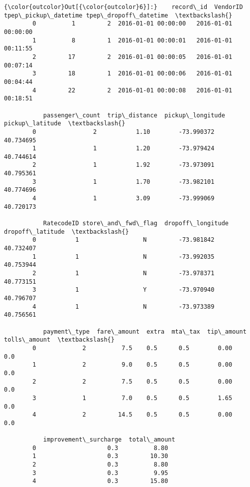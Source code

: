 \documentclass[11pt]{article}
\begin{document}
\begin{Verbatim}[commandchars=\\\{\}]
{\color{outcolor}Out[{\color{outcolor}6}]:}    record\_id  VendorID tpep\_pickup\_datetime tpep\_dropoff\_datetime  \textbackslash{}
        0          1         2  2016-01-01 00:00:00   2016-01-01 00:00:00   
        1          8         1  2016-01-01 00:00:01   2016-01-01 00:11:55   
        2         17         2  2016-01-01 00:00:05   2016-01-01 00:07:14   
        3         18         1  2016-01-01 00:00:06   2016-01-01 00:04:44   
        4         22         2  2016-01-01 00:00:08   2016-01-01 00:18:51   
        
           passenger\_count  trip\_distance  pickup\_longitude  pickup\_latitude  \textbackslash{}
        0                2           1.10        -73.990372        40.734695   
        1                1           1.20        -73.979424        40.744614   
        2                1           1.92        -73.973091        40.795361   
        3                1           1.70        -73.982101        40.774696   
        4                1           3.09        -73.999069        40.720173   
        
           RatecodeID store\_and\_fwd\_flag  dropoff\_longitude  dropoff\_latitude  \textbackslash{}
        0           1                  N         -73.981842         40.732407   
        1           1                  N         -73.992035         40.753944   
        2           1                  N         -73.978371         40.773151   
        3           1                  Y         -73.970940         40.796707   
        4           1                  N         -73.973389         40.756561   
        
           payment\_type  fare\_amount  extra  mta\_tax  tip\_amount  tolls\_amount  \textbackslash{}
        0             2          7.5    0.5      0.5        0.00           0.0   
        1             2          9.0    0.5      0.5        0.00           0.0   
        2             2          7.5    0.5      0.5        0.00           0.0   
        3             1          7.0    0.5      0.5        1.65           0.0   
        4             2         14.5    0.5      0.5        0.00           0.0   
        
           improvement\_surcharge  total\_amount  
        0                    0.3          8.80  
        1                    0.3         10.30  
        2                    0.3          8.80  
        3                    0.3          9.95  
        4                    0.3         15.80  
\end{Verbatim}
            
\end{document}

